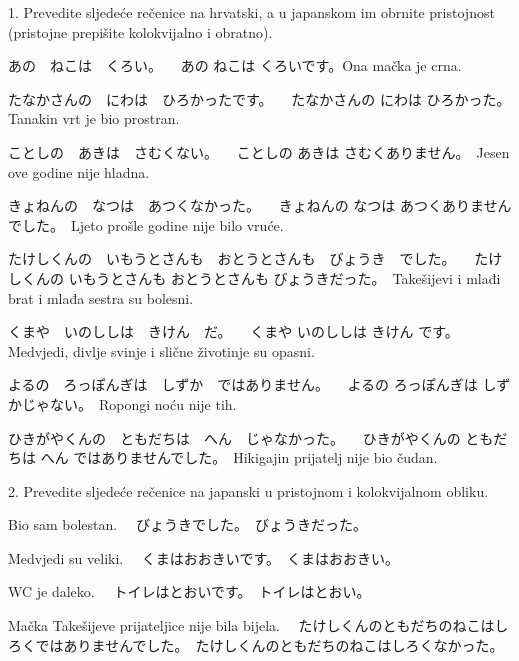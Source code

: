 
\author{Katja Kržišnik}

	
	\begin{mondai}{1. Prevedite sljedeće rečenice na hrvatski, a u japanskom im obrnite pristojnost (pristojne prepišite kolokvijalno i obratno).}
		\item あの　ねこは　くろい。 \newline　あの ねこは くろいです。Ona mačka je crna.　
		\item たなかさんの　にわは　ひろかったです。 \newline　たなかさんの にわは ひろかった。　Tanakin vrt je bio prostran.　
		\item ことしの　あきは　さむくない。 \newline　ことしの あきは さむくありません。　Jesen ove godine nije hladna.
		\item きょねんの　なつは　あつくなかった。 \newline　きょねんの なつは あつくありませんでした。　Ljeto prošle godine nije bilo vruće.　
		\item たけしくんの　いもうとさんも　おとうとさんも　びょうき　でした。 \newline　たけしくんの いもうとさんも おとうとさんも びょうきだった。　Takešijevi i mlađi brat i mlađa sestra su bolesni.
		\item くまや　いのししは　きけん　だ。 \newline　くまや いのししは きけん です。　Medvjedi, divlje svinje i slične životinje su opasni.
		\item よるの　ろっぽんぎは　しずか　ではありません。 \newline　よるの ろっぽんぎは しずかじゃない。　Ropongi noću nije tih. 
		\item ひきがやくんの　ともだちは　へん　じゃなかった。 \newline　ひきがやくんの ともだちは へん ではありませんでした。　Hikigajin prijatelj nije bio čudan.
	\end{mondai}
	
	\begin{mondai}{2. Prevedite sljedeće rečenice na japanski u pristojnom i kolokvijalnom obliku.}
		\item Bio sam bolestan. \newline　びょうきでした。　びょうきだった。
		\item Medvjedi su veliki. \newline　くまはおおきいです。　くまはおおきい。
		\item WC je daleko. \newline　トイレはとおいです。　トイレはとおい。
		\item Mačka Takešijeve prijateljice nije bila bijela. \newline　たけしくんのともだちのねこはしろくではありませんでした。　たけしくんのともだちのねこはしろくなかった。
	\end{mondai}
